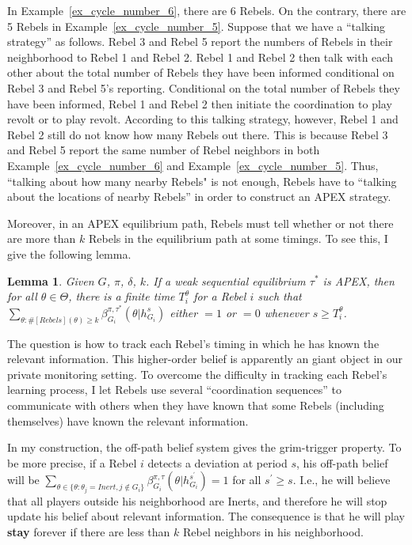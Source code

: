 \documentclass[12pt,letter]{article}
\newtheorem{lemma}{Lemma}[section]
\theoremstyle{definition}
\theoremstyle{remark}
\theoremstyle{claim}
\begin{document}
In Example~\ref{ex_cycle_number_6}, there are 6 Rebels. On the contrary, there are 5 Rebels in Example~\ref{ex_cycle_number_5}. Suppose that we have a ``talking strategy'' as follows. Rebel 3 and Rebel 5 report the numbers of  Rebels in their neighborhood to Rebel 1 and Rebel 2. Rebel 1 and Rebel 2 then talk with each other about the total number of Rebels they have been informed conditional on Rebel 3 and Rebel 5's reporting. Conditional on the total number of Rebels they have been informed, Rebel 1 and Rebel 2 then initiate the coordination to play revolt or to play revolt. According to this talking strategy, however, Rebel 1 and Rebel 2 still do not know how many Rebels out there. This is because Rebel 3 and Rebel 5 report the same number of Rebel neighbors in both Example~\ref{ex_cycle_number_6} and Example~\ref{ex_cycle_number_5}. Thus, ``talking about how many nearby Rebels"  is not enough, Rebels have to ``talking about the locations of nearby Rebels''  in order to construct an APEX strategy. 

Moreover, in an APEX equilibrium path,  Rebels must tell whether or not there are more than $k$ Rebels in the equilibrium path at some timings. To see this, I give the following lemma.
\begin{lemma}\label{lemma_learn}
Given $G$, $\pi$, $\delta$, $k$. If a weak sequential equilibrium $\tau^*$ is APEX, then for all $\theta\in \Theta$, there is a finite time $T^{\theta}_i$ for a Rebel $i$ such that $\sum_{\theta:\#[Rebels](\theta)\geq k}\beta^{\pi,\tau^*}_{G_i}(\theta|h^{s}_{G_i})$ either $=1$ or $=0$
whenever $s\geq T^{\theta}_i$.
\end{lemma}
The question is how to track each Rebel's timing in which he has known the relevant information. This higher-order belief is apparently an giant object in our private monitoring setting. To overcome the difficulty in tracking each Rebel's learning process, I let Rebels use several ``coordination sequences'' to communicate with others when they have known that some Rebels (including themselves) have known the relevant information.


In my construction, the off-path belief system gives the grim-trigger property. To be more precise, if a Rebel $i$ detects a deviation at period $s$, his off-path belief will be $\sum_{\theta \in \{\theta:\theta_j=Inert,j\notin G_i\}}\beta^{\pi,\tau}_{G_i}({\theta}|h^{s^{'}}_{G_i})=1$ for all $s^{'}\geq s$. I.e., he will believe that all players outside his neighborhood are Inerts, and therefore he will stop update his belief about relevant information. The consequence is that he will play \textbf{stay} forever if there are less than $k$ Rebel neighbors in his neighborhood. 
\end{document}
